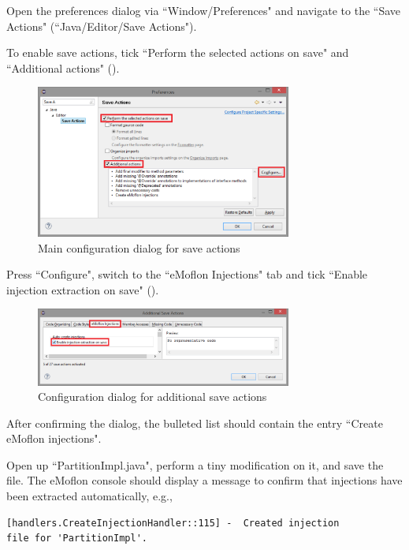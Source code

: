 \begin{stepbystep}

\item 
Open the preferences dialog via ``Window/Preferences" and navigate to the ``Save Actions" (``Java/Editor/Save Actions").

\item
To enable save actions, tick ``Perform the selected actions on save" and ``Additional actions" ().

\begin{figure}[htbp]
    \centering
    \includegraphics[width=0.75\textwidth]{../../org.moflon.doc.handbook.02_leitnersLearningBox/5_introToInjections/iImages/eclipse_injection_saveActions1.png}
    \caption{Main configuration dialog for save actions}
    \label{eclipse:injection_saveActions1}
\end{figure}

\item
Press ``Configure", switch to the ``eMoflon Injections" tab and tick ``Enable injection extraction on save" ().

\begin{figure}[htbp]
    \centering
    \includegraphics[width=0.75\textwidth]{../../org.moflon.doc.handbook.02_leitnersLearningBox/5_introToInjections/iImages/eclipse_injection_saveActions2.png}
    \caption{Configuration dialog for additional save actions}
    \label{eclipse:injection_saveActions2}
\end{figure}

\item
After confirming the dialog, the bulleted list should contain the entry ``Create eMoflon injections".

\item
Open up ``PartitionImpl.java", perform a tiny modification on it, and save the file.
The eMoflon console should display a message to confirm that injections have been extracted automatically, e.g.,
\begin{verbatim}
[handlers.CreateInjectionHandler::115] -  Created injection
file for 'PartitionImpl'.
\end{verbatim}

\end{stepbystep}

